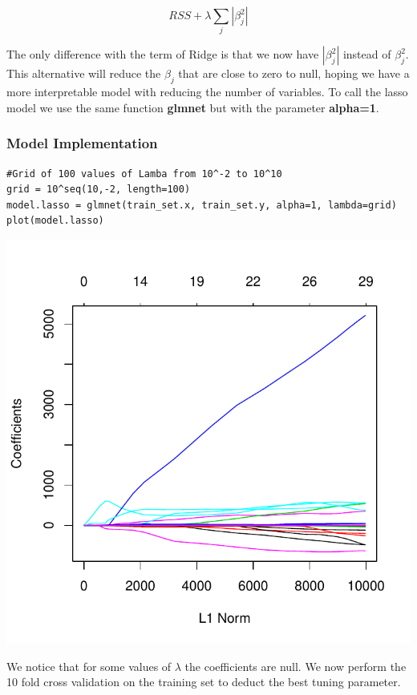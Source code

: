 \documentclass[]{report}
\begin{document}
\begin{equation} \label{eq2}
	RSS + \lambda \sum_{j}{|\beta_{j}^{2}|}
\end{equation}	

The only difference with the term of Ridge is that we now have $|\beta_{j}^{2}|$ instead of $\beta_{j}^{2}$. This alternative will reduce the $\beta_{j}$ that are close to zero to null, hoping we have a more interpretable model with reducing the number of variables. To call the lasso model we use the same function \textbf{glmnet} but with the parameter \textbf{alpha=1}.
 
\subsubsection{Model Implementation}
\begin{lstlisting}
#Grid of 100 values of Lamba from 10^-2 to 10^10
grid = 10^seq(10,-2, length=100)
model.lasso = glmnet(train_set.x, train_set.y, alpha=1, lambda=grid)
plot(model.lasso)
\end{lstlisting}

\begin{center}
	\includegraphics[width=0.8\linewidth]{Figures/lasso_model.pdf}
\end{center}

We notice that for some values of $\lambda$ the coefficients are null. We now perform the 10 fold cross validation on the training set to deduct the best tuning parameter.
\end{document}
